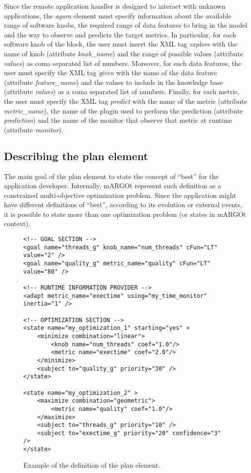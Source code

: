 Since the remote application handler is designed to interact with unknown applications, the \textit{agora} element must specify information about the available range of software knobs, the required range of data features to bring in the model and the way to observe and predicts the target metrics.
In particular, for each software knob of the block, the user must insert the XML tag \textit{explore} with the name of knob (attribute \textit{knob\_name}) and the range of possible values (attribute \textit{values}) as coma separated list of numbers.
Moreover, for each data features, the user must specify the XML tag \textit{given} with the name of the data feature (attribute \textit{feature\_name}) and the values to include in the knowledge base (attribute \textit{values}) as a coma separated list of numbers.
Finally, for each metric, the user must specify the XML tag \textit{predict} with the name of the metric (attribute \textit{metric\_name}), the name of the plugin used to perform the prediction (attribute \textit{prediction}) and the name of the monitor that observe that metric at runtime (attribute \textit{monitor}).
	



\subsection{Describing the plan element}

The main goal of the plan element to state the concept of ``best'' for the application developer.
Internally, mARGOt represent such definition as a constrained multi-objective optimization problem.
Since the application might have different definitions of ``best'', according to its evolution or external events, it is possible to state more than one optimization problem (or states in mARGOt context). 



\begin{figure}
\lstset{language=XML}
\begin{lstlisting}
<!-- GOAL SECTION -->
<goal name="threads_g" knob_name="num_threads" cFun="LT" value="2" />
<goal name="quality_g" metric_name="quality" cFun="LT" value="80" />

<!-- RUNTIME INFORMATION PROVIDER -->
<adapt metric_name="exectime" using="my_time_monitor" inertia="1" />

<!-- OPTIMIZATION SECTION -->
<state name="my_optimization_1" starting="yes" >
	<minimize combination="linear">
		<knob name="num_threads" coef="1.0"/>
		<metric name="exectime" coef="2.0"/>
	</minimize>
	<subject to="quality_g" priority="30" />
</state>

<state name="my_optimization_2" >
	<maximize combination="geometric">
		<metric name="quality" coef="1.0"/>
	</maximize>
	<subject to="threads_g" priority="10" />
	<subject to="exectime_g" priority="20" confidence="3" />
</state>

\end{lstlisting}
\caption{Example of the definition of the plan element.}
\label{code:plan_xml}
\end{figure}

